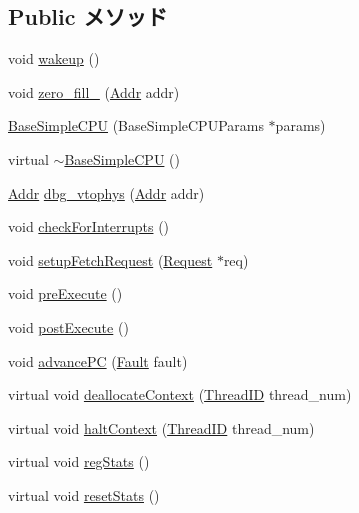 \subsection*{Public メソッド}
\begin{DoxyCompactItemize}
\item 
void \hyperlink{classBaseSimpleCPU_ae674290a26ecbd622c5160e38e8a4fe9}{wakeup} ()
\item 
void \hyperlink{classBaseSimpleCPU_ab009616bac40c9b920ed54fccca517a9}{zero\_\-fill\_} (\hyperlink{base_2types_8hh_af1bb03d6a4ee096394a6749f0a169232}{Addr} addr)
\item 
\hyperlink{classBaseSimpleCPU_a71551db7d052136dcf3e0ff87f935568}{BaseSimpleCPU} (BaseSimpleCPUParams $\ast$params)
\item 
virtual \hyperlink{classBaseSimpleCPU_a42056bddf302c92cf50f79e3d184ccfa}{$\sim$BaseSimpleCPU} ()
\item 
\hyperlink{base_2types_8hh_af1bb03d6a4ee096394a6749f0a169232}{Addr} \hyperlink{classBaseSimpleCPU_a7e2d118d430dcbebd896ba39811ef03b}{dbg\_\-vtophys} (\hyperlink{base_2types_8hh_af1bb03d6a4ee096394a6749f0a169232}{Addr} addr)
\item 
void \hyperlink{classBaseSimpleCPU_afc6b0526014df091373ec2c850508a55}{checkForInterrupts} ()
\item 
void \hyperlink{classBaseSimpleCPU_a06bcbb6a9e9cbcf60796a0843cdf9a35}{setupFetchRequest} (\hyperlink{classRequest}{Request} $\ast$req)
\item 
void \hyperlink{classBaseSimpleCPU_ad341f256f4b26b20980f548e42ea79c4}{preExecute} ()
\item 
void \hyperlink{classBaseSimpleCPU_a86cfcf0bbf35e6f79ccf03bd9436f633}{postExecute} ()
\item 
void \hyperlink{classBaseSimpleCPU_a9ff8fd374877c2ff6c10178aaad00852}{advancePC} (\hyperlink{classRefCountingPtr}{Fault} fault)
\item 
virtual void \hyperlink{classBaseSimpleCPU_a49259982c98a7959f39b77db5069fea0}{deallocateContext} (\hyperlink{base_2types_8hh_ab39b1a4f9dad884694c7a74ed69e6a6b}{ThreadID} thread\_\-num)
\item 
virtual void \hyperlink{classBaseSimpleCPU_ab39525f324a8a93139e17327f6ccde10}{haltContext} (\hyperlink{base_2types_8hh_ab39b1a4f9dad884694c7a74ed69e6a6b}{ThreadID} thread\_\-num)
\item 
virtual void \hyperlink{classBaseSimpleCPU_a4dc637449366fcdfc4e764cdf12d9b11}{regStats} ()
\item 
virtual void \hyperlink{classBaseSimpleCPU_a65880e61108132689a1bd769b9187fb7}{resetStats} ()

\end{DoxyCompactItemize}
